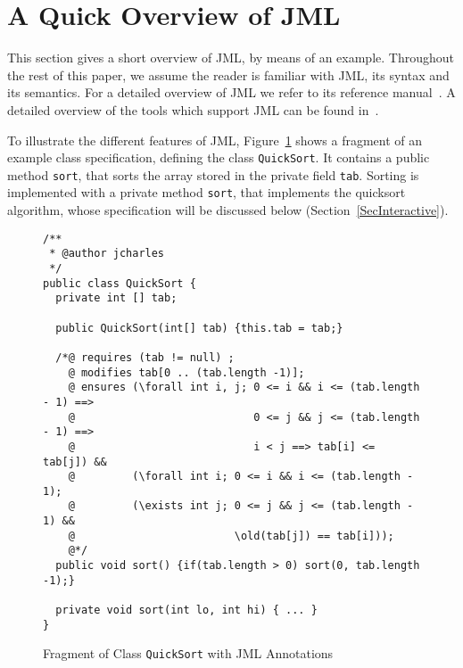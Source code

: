 \section{A Quick Overview of JML}\label{SecJML}


This section gives a short overview of JML, by means of an
example. Throughout the rest of this paper, we assume the reader is
familiar with JML, its syntax and its semantics. For a detailed
overview of JML we refer to its reference
manual~\cite{JMLReferenceManual05}. A detailed overview of the tools
which support JML can be found in~\cite{BurdyCCEKLLP05}.


To illustrate the different features of JML, Figure~\ref{FigJMLSpec}
shows a fragment of an example class specification, defining the class
\texttt{QuickSort}. It contains a public method
\texttt{sort}, that sorts the array stored in the private field
\texttt{tab}. Sorting is implemented with a private method
\texttt{sort}, that implements the quicksort algorithm, whose
specification will be discussed below (Section~\ref{SecInteractive}). 

\begin{figure}[t!]
{\small
\begin{verbatim}
/**
 * @author jcharles
 */
public class QuickSort {
  private int [] tab;

  public QuickSort(int[] tab) {this.tab = tab;}

  /*@ requires (tab != null) ;
    @ modifies tab[0 .. (tab.length -1)];
    @ ensures (\forall int i, j; 0 <= i && i <= (tab.length - 1) ==> 
    @                            0 <= j && j <= (tab.length - 1) ==>
    @                            i < j ==> tab[i] <= tab[j]) &&
    @         (\forall int i; 0 <= i && i <= (tab.length - 1); 
    @         (\exists int j; 0 <= j && j <= (tab.length - 1) && 
    @                         \old(tab[j]) == tab[i])); 
    @*/
  public void sort() {if(tab.length > 0) sort(0, tab.length -1);}

  private void sort(int lo, int hi) { ... }
}
\end{verbatim}
}
\vspace*{-1em}\caption{Fragment of Class \texttt{QuickSort} with JML Annotations} 
\label{FigJMLSpec}
\end{figure}


